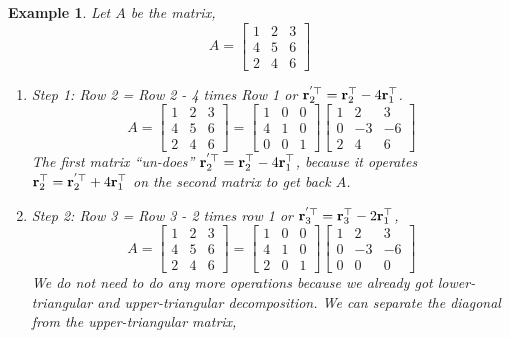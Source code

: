 \documentclass[twocolumn]{article}
\newtheorem{example}{Example}
\begin{document}
\begin{example}
  Let $A$ be   the  matrix,
  \[
    A   =  \begin{bmatrix}
      1 &   2  &  3  \\
      4 & 5 &   6 \\
      2 & 4 &   6
    \end{bmatrix}
    \]
\begin{enumerate}
  \item  Step  1: Row 2 = Row  2 -  4 times Row  1  or $\mathbf{r}_2^{'\top} =
    \mathbf{r}_2^\top  -  4 \mathbf{r}_1^\top$.
    \[
      A   =  \begin{bmatrix}
        1 &   2  &  3  \\
        4 & 5 &   6 \\
        2 & 4 &   6
      \end{bmatrix}
      =   \begin{bmatrix}
        1 & 0  &  0 \\
        4  &  1 &  0  \\
        0  &  0 &  1
        \end{bmatrix}\begin{bmatrix}
        1 & 2 &  3  \\
        0 & -3 &  -6 \\
        2 & 4 &  6
      \end{bmatrix}
    \]
    The  first  matrix ``un-does'' $\mathbf{r}_2^{'\top} =
    \mathbf{r}_2^\top  -  4 \mathbf{r}_1^\top$, because  it  operates  $\mathbf{r}_2^{\top} =
    \mathbf{r}_2^{'\top}  +  4 \mathbf{r}_1^\top$    on  the   second  matrix  to get back $A$.
  \item Step 2: Row  3  =   Row  3 - 2  times row 1  or   $\mathbf{r}_3^{'\top} =
    \mathbf{r}_3^\top  -  2 \mathbf{r}_1^\top$,
    \[
      A   =  \begin{bmatrix}
        1 &   2  &  3  \\
        4 & 5 &   6 \\
        2 & 4 &   6
      \end{bmatrix}
      =   \begin{bmatrix}
        1 & 0  &  0 \\
        4  &  1 &  0  \\
        2  &  0 &  1
      \end{bmatrix}\begin{bmatrix}
        1 & 2 &  3  \\
        0 & -3 &  -6 \\
        0 & 0 &  0
      \end{bmatrix}
    \]
    We do   not need to do any more  operations because we already got
    lower-triangular  and  upper-triangular   decomposition.  We can separate
    the diagonal from the  upper-triangular  matrix,


\end{enumerate}
\end{example}
\end{document}

